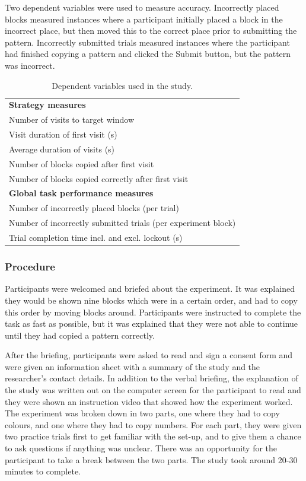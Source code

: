 Two dependent variables were used to measure accuracy. Incorrectly placed blocks measured instances where a participant initially placed a block in the incorrect place, but then moved this to the correct place prior to submitting the pattern. Incorrectly submitted trials measured instances where the participant had finished copying a pattern and clicked the Submit button, but the pattern was incorrect.

\begin{table}[htp]
\centering
    \begin{tabular}{  l }
    \hline
    \textbf{ Strategy measures} \\  
    Number of visits to target window  \\ 
    Visit duration of first visit (s)  \\
    Average duration of visits (s) \\
    Number of blocks copied after first visit \\
    Number of blocks copied correctly after first visit 
    
    \vspace{10pt} \\
    
\textbf{Global task performance measures} \\ 
Number of incorrectly placed blocks (per trial) \\
Number of incorrectly submitted trials (per experiment block) \\
Trial completion time incl. and excl. lockout (s) \\ \hline
    \end{tabular}
    \caption[Study 3 dependent variables]{Dependent variables used in the study.}
    \label{table:ch4_dvs}
\end{table}

\subsubsection{Procedure}
Participants were welcomed and briefed about the experiment. It was explained they would be shown nine blocks which were in a certain order, and had to copy this order by moving blocks around. Participants were instructed to complete the task as fast as possible, but it was explained that they were not able to continue until they had copied a pattern correctly. 

After the briefing, participants were asked to read and sign a consent form and were given an information sheet with a summary of the study and the researcher's contact details. In addition to the verbal briefing, the explanation of the study was written out on the computer screen for the participant to read and they were shown an instruction video that showed how the experiment worked. 
The experiment was broken down in two parts, one where they had to copy colours, and one where they had to copy numbers. For each part, they were given two practice trials first to get familiar with the set-up, and to give them a chance to ask questions if anything was unclear. There was an opportunity for the participant to take a break between the two parts. The study took around 20-30 minutes to complete.

